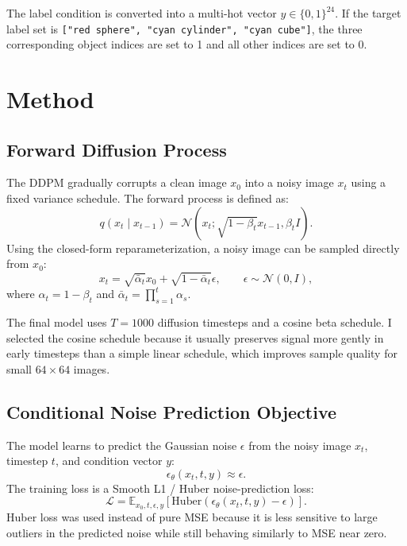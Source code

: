 \documentclass[12pt,a4paper]{article}
\begin{document}
The label condition is converted into a multi-hot vector
$y \in \{0,1\}^{24}$.  If the target label set is
\texttt{["red sphere", "cyan cylinder", "cyan cube"]}, the three corresponding
object indices are set to 1 and all other indices are set to 0.

\newpage

\section{Method}

\subsection{Forward Diffusion Process}

The DDPM gradually corrupts a clean image $x_0$ into a noisy image $x_t$ using
a fixed variance schedule.  The forward process is defined as:
\[
    q(x_t \mid x_{t-1})
    =
    \mathcal{N}\left(
        x_t;\sqrt{1-\beta_t}x_{t-1}, \beta_t I
    \right).
\]
Using the closed-form reparameterization, a noisy image can be sampled directly
from $x_0$:
\[
    x_t
    =
    \sqrt{\bar{\alpha}_t}x_0
    +
    \sqrt{1-\bar{\alpha}_t}\epsilon,
    \qquad
    \epsilon \sim \mathcal{N}(0,I),
\]
where $\alpha_t = 1-\beta_t$ and
$\bar{\alpha}_t=\prod_{s=1}^{t}\alpha_s$.

The final model uses $T=1000$ diffusion timesteps and a cosine beta schedule.
I selected the cosine schedule because it usually preserves signal more gently
in early timesteps than a simple linear schedule, which improves sample quality
for small $64 \times 64$ images.

\subsection{Conditional Noise Prediction Objective}

The model learns to predict the Gaussian noise $\epsilon$ from the noisy image
$x_t$, timestep $t$, and condition vector $y$:
\[
    \epsilon_{\theta}(x_t,t,y) \approx \epsilon.
\]
The training loss is a Smooth L1 / Huber noise-prediction loss:
\[
    \mathcal{L}
    =
    \mathbb{E}_{x_0,t,\epsilon,y}
    \left[
        \mathrm{Huber}\left(
            \epsilon_{\theta}(x_t,t,y) - \epsilon
        \right)
    \right].
\]
Huber loss was used instead of pure MSE because it is less sensitive to large
outliers in the predicted noise while still behaving similarly to MSE near
zero.
\end{document}
